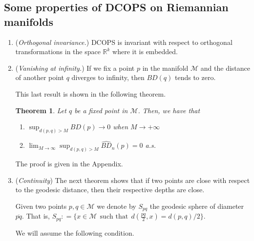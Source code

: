 \documentclass[a4paper]{article}
\def\defeq{\mathrel{\mathop:}=}
\numberwithin{equation}{section}
\newtheorem{theorem}{Theorem}[section]
\def\defeq{\mathrel{\mathop:}=}
\newcommand{\M}{\mbox{$\mathcal{M}$}}
\newcommand{\R}{\mbox{$\mathbb{R}$}}
\begin{document}
\subsection{Some properties of DCOPS on Riemannian manifolds}
\label{pdcops}
\begin{enumerate}
\item (\textit{Orthogonal invariance.})
DCOPS is invariant with respect to orthogonal transformations in the space  $\R^k$ where it is embedded.
\item (\textit{Vanishing at infinity.})
If we fix a point $p$ in the manifold $\mathcal M$ and the distance of another point $q$ diverges to infinity, then $BD(q)$ tends to zero.

This last result is shown in the following theorem.
\begin{theorem}
Let  $q$ be a fixed point in $\M$. Then, we have that 
\label{desvanecimientoinfinitomanifold}
\begin{enumerate}
\item[(a)] $\sup_{d(p,q)>M} BD(p) \rightarrow 0 $   when  $M \rightarrow +\infty$  
\item[(b)] $ \lim_{M\to \infty} \sup_{d(p,q)>M} \widehat{BD}_n(p)=0$ a.s.
\end{enumerate}
\end{theorem}
The proof is given in the Appendix. 




\item (\textit{Continuity})
The next theorem shows that if two points are close with respect to the geodesic distance, then their respective depths are close. 

Given two points $p, q \in \mathcal M$ we denote by $S_{pq}$  the geodesic sphere of diameter $\overline{pq}$. That is,
 $S_{pq} \defeq \{x \in \M \ \ \mbox{such that} \ \  d(\frac{pq}{2},x)= d(p,q) /2\}$.

We will assume the following condition.


\end{enumerate}
\end{document}
